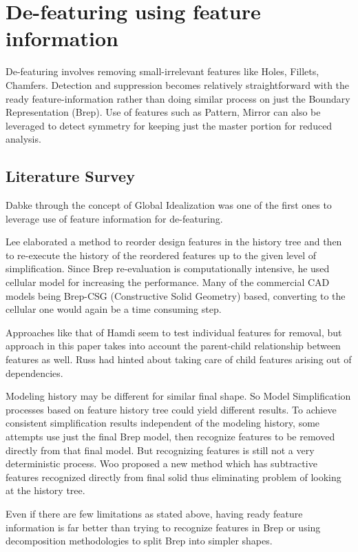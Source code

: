 \section{De-featuring using feature information}
	
	De-featuring involves removing small-irrelevant features like Holes, Fillets, Chamfers. Detection and suppression becomes relatively straightforward with the ready feature-information rather than doing similar process on just the Boundary Representation (Brep). Use of features such as Pattern, Mirror can also be leveraged to detect symmetry for keeping just the master portion for reduced analysis. 

\subsection{Literature Survey}

Dabke \citep{Dabke1994} through the concept of Global Idealization was one of the first ones to leverage use of feature information for de-featuring. 

	 Lee \citep{Lee2005} elaborated a method to reorder design features in the history tree and then to re-execute the history of the reordered features up to the given level of simplification. Since Brep re-evaluation is computationally intensive, he used cellular model for increasing the performance. Many of the commercial CAD models being Brep-CSG (Constructive Solid Geometry) based, converting to the cellular one would again be a time consuming step.

Approaches like that of Hamdi \citep{Hamdi2005}  seem to test individual features for removal, but approach in this paper takes into account the parent-child relationship between features as well. Russ \citep{Russ2012} had hinted about taking care of child features arising out of dependencies. 

	Modeling history may be different for similar final shape. So Model Simplification processes based on feature history tree could yield different results. To achieve consistent simplification results independent of the modeling history, some attempts use just the final Brep model, then recognize features to be removed directly from that final model.  But recognizing features is still not a very deterministic process. Woo \citep{Woo2009} proposed a new method which has subtractive features recognized directly from final solid thus eliminating problem of looking at the history tree. 

Even if there are few limitations as stated above, having ready feature information is far better than trying to recognize features in Brep or using decomposition methodologies to split Brep into simpler shapes.

